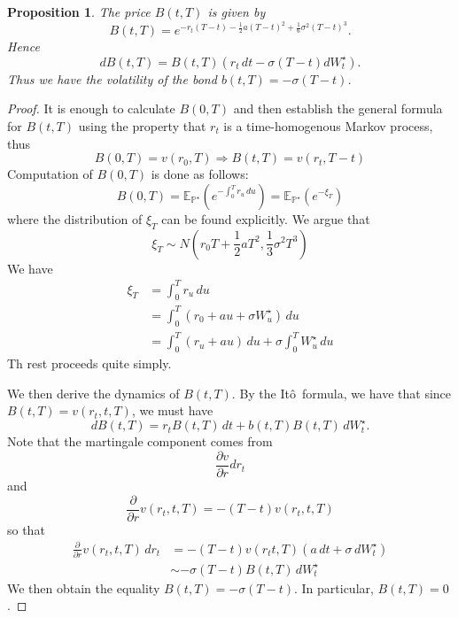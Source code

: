 \documentclass[10pt, oneside, reqno]{amsbook}
\theoremstyle{plain}%
\newtheorem{prop}[thm]{Proposition}
\theoremstyle{definition}
\theoremstyle{remark}
\newcommand{\E}{\mathbb{E}}
\renewcommand{\P}{\mathbb{P}}
\newcommand{\ito}{It\^o\ }
\numberwithin{equation}{chapter}
\begin{document}
    \begin{prop}
        The price $B(t, T)$ is given by \begin{equation}
            \label{eq:merton_short_rate_price}
            B(t, T) = e^{-r_t(T-t) - \frac{1}{2}a(T-t)^2 + \frac{1}{6} \sigma^2(T-t)^3}.  
        \end{equation}  Hence \[
            dB(t, T) = B(t, T)\left(r_t \, dt - \sigma(T-t) dW^\star_t \right).
        \]  Thus we have the volatility of the bond $b(t, T) = -\sigma(T-t)$.
    \end{prop}
    
    \begin{proof}
        It is enough to calculate $B(0, T)$ and then establish the general formula for $B(t, T)$ using the property that $r_t$ is a time-homogenous Markov process, thus \[
            B(0, T) = v(r_0, T) \Rightarrow B(t, T) =v(r_t, T-t)
        \]
        Computation of $B(0, T)$ is done as follows:\[
            B(0, T) = \E_{\P^\star} \left(e^{-\int_0^T r_u \, du} \right) = \E_{\P^\star} \left( e^{-\xi_T} \right)
        \] where the distribution of $\xi_T$ can be found explicitly.  We argue that \[
            \xi_T \sim N\left(r_0 T + \frac{1}{2} a T^2, \frac{1}{3} \sigma^2 T^3 \right)
        \]  We have \begin{align*}
            \xi_T   &= \int_0^T r_u \, du \\
                    &= \int_0^T \left( r_0 + au + \sigma W^\star_u \right) \, du \\
                    &= \int_0^T (r_u + au)  \, du + \sigma \int_0^T W^\star_u \, du
        \end{align*}
        Th rest proceeds quite simply.
        
        We then derive the dynamics of $B(t, T)$.  By the \ito formula, we have that since $B(t, T) = v(r_t, t, T)$, we must have \[
            dB(t, T) = r_t B(t, T) \, dt + b(t, T) B(t, T) \, dW^\star_t.  
        \] Note that the martingale component comes from \[
            \frac{\partial v}{\partial r} dr_t 
        \] and \[
            \frac{\partial}{\partial r}v(r_t, t, T) = -(T- t) v(r_t, t, T)
        \] so that \begin{align*}
            \frac{\partial}{\partial r}v(r_t, t, T) \, dr_t &= -(T-t) v(r_t t, T) (a \, dt + \sigma \, dW^\star_t) \\
            &\sim - \sigma(T- t)B(t, T) \, dW^\star_t
        \end{align*}  We then obtain the equality $B(t, T) = -\sigma(T-t)$.  In particular, $B(t, T) = 0$.  
    \end{proof}
    
\end{document}
